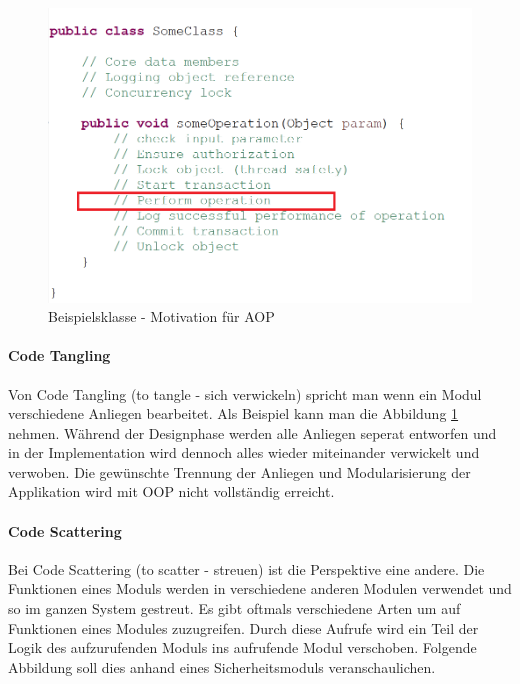 \begin{figure}[H]
	\centering
		\includegraphics[scale=1.0]{bilder/motivationprogram}
	\caption{Beispielsklasse - Motivation für AOP}
	\label{fig:classmotivationaop}
\end{figure}



\paragraph{Code Tangling}

Von Code Tangling (to tangle - sich verwickeln) spricht man wenn ein Modul verschiedene Anliegen bearbeitet. Als Beispiel kann man die Abbildung \ref{fig:classmotivationaop} nehmen. Während der Designphase werden alle Anliegen seperat entworfen und in der Implementation wird dennoch alles wieder miteinander verwickelt und verwoben. Die gewünschte Trennung der Anliegen und Modularisierung der Applikation wird mit OOP nicht vollständig erreicht.

\paragraph{Code Scattering}

Bei Code Scattering (to scatter - streuen) ist die Perspektive eine andere. Die Funktionen eines Moduls werden in verschiedene anderen Modulen verwendet und so im ganzen System gestreut. Es gibt oftmals verschiedene Arten um auf Funktionen eines Modules zuzugreifen. Durch diese Aufrufe wird ein Teil der Logik des aufzurufenden Moduls ins aufrufende Modul verschoben. Folgende Abbildung soll dies anhand eines Sicherheitsmoduls veranschaulichen.

